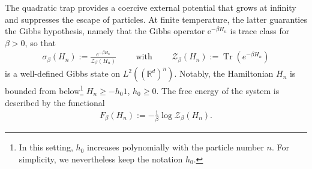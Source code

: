 \documentclass[11pt]{amsart}
\newcommand{\1}{\mathbbm{1}}
\newcommand{\Tr}{\operatorname{Tr}}
\theoremstyle{plain}
\theoremstyle{definition}
\theoremstyle{remark}
\numberwithin{equation}{section}
\begin{document}
The quadratic trap provides a coercive external potential that grows at infinity and suppresses
the escape of particles. At finite temperature, the latter guaranties the Gibbs hypothesis, namely that the Gibbs operator $\mathrm e^{-\beta H_n}$ is trace class for \(\beta>0\), so that
\begin{align*}
\sigma_\beta(H_n):=\frac{e^{-\beta H_n}}{\mathcal{Z}_\beta(H_n)}\qquad \text{ with }\qquad \mathcal{Z}_\beta(H_n):=\Tr(e^{-\beta H_n})
\end{align*}
is a well-defined Gibbs state on $L^2((\mathbb{R}^d)^n)$. Notably, the Hamiltonian $H_n$
is bounded from below\footnote{In this setting, \(h_0\) increases polynomially with the particle number \(n\). For simplicity, we nevertheless keep the notation \(h_0\).} $H_n\ge -h_0 1$, $h_0\ge 0$. The free energy of the system is described by the functional 
\begin{align*}
F_\beta(H_n):=-\frac{1}{\beta}\log\mathcal{Z}_\beta(H_n).
\end{align*}
\end{document}
